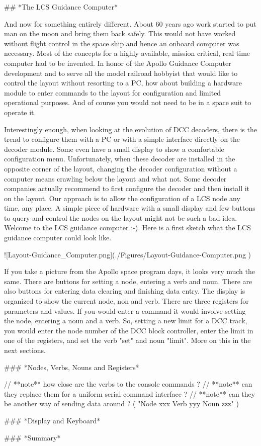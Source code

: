 ## *The LCS Guidance Computer*

And now for something entirely different. About 60 years ago work started to put man on the moon and bring them back safely. This would not have worked without flight control in the space ship and hence an onboard computer was necessary. Most of the concepts for a highly available, mission critical, real time computer had to be invented. In honor of the Apollo Guidance Computer development and to serve all the model railroad hobbyist that would like to control the layout without resorting to a PC, how about building a hardware module to enter commands to the layout for configuration and limited operational purposes. And of course you would not need to be in a space suit to operate it.

Interestingly enough, when looking at the evolution of DCC decoders, there is the trend to configure them with a PC or with a simple interface directly on the decoder module. Some even have a small display to show a comfortable configuration menu. Unfortunately, when these decoder are installed in the opposite corner of the layout, changing the decoder configuration without a computer means crawling below the layout and what not. Some decoder companies actually recommend to first configure the decoder and then install it on the layout. Our approach is to allow the configuration of a LCS node any time, any place. A simple piece of hardware with a small display and few buttons to query and control the nodes on the layout might not be such a bad idea. Welcome to the LCS guidance computer :-). Here is a first sketch what the LCS guidance computer could look like.

![Layout-Guidance_Computer.png](./Figures/Layout-Guidance-Computer.png )

If you take a picture from the Apollo space program days, it looks very much the same. There are buttons for setting a node, entering a verb and noun. There are also buttons for entering data clearing and finishing data entry. The display is organized to show the current node, non and verb. There are three registers for parameters and values. If you would enter a command it would involve setting the node, entering a noun and a verb. So, setting a new limit for a DCC track, you would enter the node number of the DCC block controller, enter the limit in one of the registers, and set the verb "set" and noun "limit". More on this in the next sections.

### *Nodes, Verbs, Nouns and Registers*

// **note** how close are the verbs to the console commands ?
// **note** can they replace them for a uniform serial command interface ?
// **note** can they be another way of sending data around ? ( "Node xxx Verb yyy Noun zzz" )


### *Display and Keyboard*


### *Summary*
